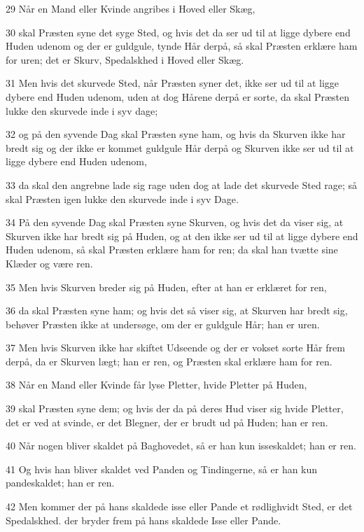 \par 29 Når en Mand eller Kvinde angribes i Hoved eller Skæg,
\par 30 skal Præsten syne det syge Sted, og hvis det da ser ud til at ligge dybere end Huden udenom og der er guldgule, tynde Hår derpå, så skal Præsten erklære ham for uren; det er Skurv, Spedalskhed i Hoved eller Skæg.
\par 31 Men hvis det skurvede Sted, når Præsten syner det, ikke ser ud til at ligge dybere end Huden udenom, uden at dog Hårene derpå er sorte, da skal Præsten lukke den skurvede inde i syv dage;
\par 32 og på den syvende Dag skal Præsten syne ham, og hvis da Skurven ikke har bredt sig og der ikke er kommet guldgule Hår derpå og Skurven ikke ser ud til at ligge dybere end Huden udenom,
\par 33 da skal den angrebne lade sig rage uden dog at lade det skurvede Sted rage; så skal Præsten igen lukke den skurvede inde i syv Dage.
\par 34 På den syvende Dag skal Præsten syne Skurven, og hvis det da viser sig, at Skurven ikke har bredt sig på Huden, og at den ikke ser ud til at ligge dybere end Huden udenom, så skal Præsten erklære ham for ren; da skal han tvætte sine Klæder og være ren.
\par 35 Men hvis Skurven breder sig på Huden, efter at han er erklæret for ren,
\par 36 da skal Præsten syne ham; og hvis det så viser sig, at Skurven har bredt sig, behøver Præsten ikke at undersøge, om der er guldgule Hår; han er uren.
\par 37 Men hvis Skurven ikke har skiftet Udseende og der er vokset sorte Hår frem derpå, da er Skurven lægt; han er ren, og Præsten skal erklære ham for ren.
\par 38 Når en Mand eller Kvinde får lyse Pletter, hvide Pletter på Huden,
\par 39 skal Præsten syne dem; og hvis der da på deres Hud viser sig hvide Pletter, det er ved at svinde, er det Blegner, der er brudt ud på Huden; han er ren.
\par 40 Når nogen bliver skaldet på Baghovedet, så er han kun isseskaldet; han er ren.
\par 41 Og hvis han bliver skaldet ved Panden og Tindingerne, så er han kun pandeskaldet; han er ren.
\par 42 Men kommer der på hans skaldede isse eller Pande et rødlighvidt Sted, er det Spedalskhed. der bryder frem på hans skaldede Isse eller Pande.
